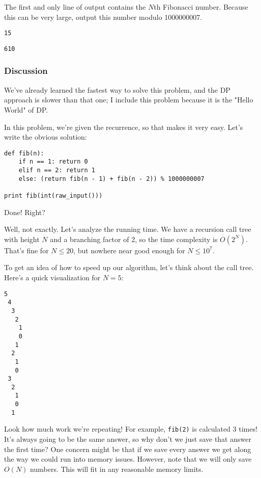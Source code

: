 The first and only line of output contains the $N$th Fibonacci number. Because this can be very large, output this number modulo 1000000007.


\begin{verbatim}
15
\end{verbatim}


\begin{verbatim}
610
\end{verbatim}

\subsubsection*{Discussion}

We've already learned the fastest way to solve this problem, and the DP approach is slower than that one; I include this problem because it is the "Hello World" of DP.

In this problem, we're given the recurrence, so that makes it very easy. Let's write the obvious solution:

\begin{verbatim}
def fib(n):
    if n == 1: return 0
    elif n == 2: return 1
    else: (return fib(n - 1) + fib(n - 2)) % 1000000007

print fib(int(raw_input()))
\end{verbatim}

Done! Right?

Well, not exactly. Let's analyze the running time. We have a recursion call tree with height $N$ and a branching factor of 2, so the time complexity is $O(2^N)$. That's fine for $N \leq 20$, but nowhere near good enough for $N \leq 10^7$.

To get an idea of how to speed up our algorithm, let's think about the call tree. Here's a quick visualization for $N = 5$:

\begin{verbatim}
5
 4
  3
   2
    1
    0
   1
  2
   1
   0
 3
  2
   1
   0
  1
\end{verbatim}

Look how much work we're repeating! For example, \texttt{fib(2)} is calculated 3 times! It's always going to be the same answer, so why don't we just save that answer the first time? One concern might be that if we save every answer we get along the way we could run into memory issues. However, note that we will only save $O(N)$ numbers. This will fit in any reasonable memory limits.

